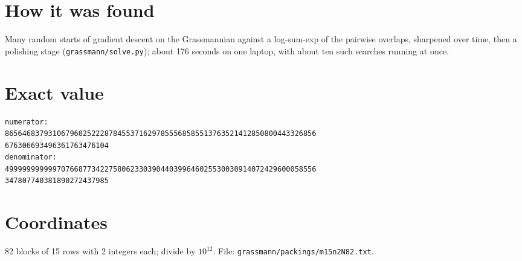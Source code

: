\documentclass[11pt,a4paper]{article}
\begin{document}
\section{How it was found}
Many random starts of gradient descent on the Grassmannian against a log-sum-exp of the pairwise overlaps, sharpened over time, then a polishing stage (\texttt{grassmann/solve.py}); about 176 seconds on one laptop, with about ten such searches running at once.


\appendix
\section{Exact value}
{\small
\begin{verbatim}
numerator:
865646837931067960252228784553716297855568585513763521412850800443326856
676306693496361763476104
denominator:
499999999999707668773422758062330390440399646025530030914072429600058556
347807740381890272437985
\end{verbatim}}

\section{Coordinates}
82 blocks of 15 rows with 2 integers each; divide by $10^{12}$. File: \texttt{grassmann/packings/m15n2N82.txt}.
{\tiny
\begin{multicols}{4}
\end{multicols}}
\end{document}
